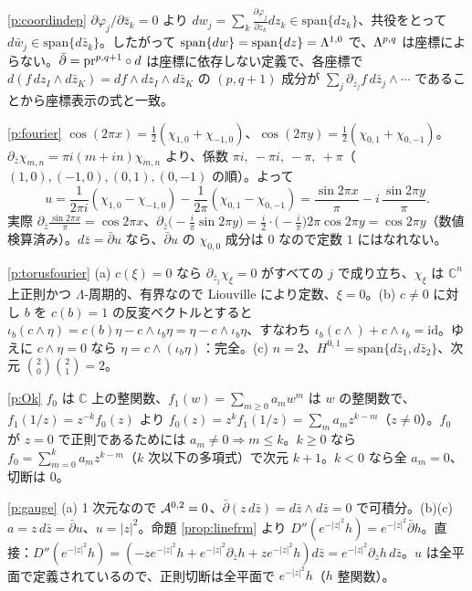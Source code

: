 \begin{sol}{\ref{p:coordindep}}
$\partial\varphi_j/\partial\bar z_k=0$ より $dw_j=\sum_k\frac{\partial\varphi_j}{\partial z_k}dz_k\in\mathrm{span}\{dz_k\}$、共役をとって $d\bar w_j\in\mathrm{span}\{d\bar z_k\}$。したがって $\mathrm{span}\{dw\}=\mathrm{span}\{dz\}=\Lambda^{1,0}$ で、$\Lambda^{p,q}$ は座標によらない。$\bar\partial=\mathrm{pr}^{p,q+1}\circ d$ は座標に依存しない定義で、各座標で $d(f\,dz_I\wedge d\bar z_K)=df\wedge dz_I\wedge d\bar z_K$ の $(p,q+1)$ 成分が $\sum_j\partial_{\bar z_j}f\,d\bar z_j\wedge\cdots$ であることから座標表示の式と一致。
\end{sol}
\begin{sol}{\ref{p:fourier}}
$\cos(2\pi x)=\frac12(\chi_{1,0}+\chi_{-1,0})$、$\cos(2\pi y)=\frac12(\chi_{0,1}+\chi_{0,-1})$。$\partial_{\bar z}\chi_{m,n}=\pi i(m+in)\chi_{m,n}$ より、係数 $\pi i,\ -\pi i,\ -\pi,\ +\pi$（$(1,0),(-1,0),(0,1),(0,-1)$ の順）。よって
\[
u=\frac1{2\pi i}(\chi_{1,0}-\chi_{-1,0})-\frac1{2\pi}(\chi_{0,1}-\chi_{0,-1})=\frac{\sin 2\pi x}{\pi}-i\,\frac{\sin2\pi y}{\pi}.
\]
実際 $\partial_{\bar z}\frac{\sin2\pi x}\pi=\cos2\pi x$、$\partial_{\bar z}\big(-\tfrac i\pi\sin2\pi y\big)=\frac i2\cdot\big(-\tfrac i\pi\big)2\pi\cos2\pi y=\cos2\pi y$（数値検算済み）。$d\bar z=\bar\partial u$ なら、$\bar\partial u$ の $\chi_{0,0}$ 成分は $0$ なので定数 $1$ にはなれない。
\end{sol}
\begin{sol}{\ref{p:torusfourier}}
(a) $c(\xi)=0$ なら $\partial_{\bar z_j}\chi_\xi=0$ がすべての $j$ で成り立ち、$\chi_\xi$ は $\mathbb C^n$ 上正則かつ $\Lambda$-周期的、有界なので Liouville により定数、$\xi=0$。(b) $c\ne0$ に対し $b$ を $c(b)=1$ の反変ベクトルとすると $\iota_b(c\wedge\eta)=c(b)\eta-c\wedge\iota_b\eta=\eta-c\wedge\iota_b\eta$、すなわち $\iota_b(c\wedge)+c\wedge\iota_b=\mathrm{id}$。ゆえに $c\wedge\eta=0$ なら $\eta=c\wedge(\iota_b\eta)$：完全。(c) $n=2$、$H^{0,1}=\mathrm{span}\{d\bar z_1,d\bar z_2\}$、次元 $\binom20\binom21=2$。
\end{sol}
\begin{sol}{\ref{p:Ok}}
$f_0$ は $\mathbb C$ 上の整関数、$f_1(w)=\sum_{m\ge0}a_mw^m$ は $w$ の整関数で、$f_1(1/z)=z^{-k}f_0(z)$ より $f_0(z)=z^kf_1(1/z)=\sum_ma_mz^{k-m}$（$z\ne0$）。$f_0$ が $z=0$ で正則であるためには $a_m\ne0\Rightarrow m\le k$。$k\ge0$ なら $f_0=\sum_{m=0}^ka_mz^{k-m}$（$k$ 次以下の多項式）で次元 $k+1$。$k<0$ なら全 $a_m=0$、切断は $0$。
\end{sol}
\begin{sol}{\ref{p:gauge}}
(a) 1 次元なので $\mathcal A^{0,2}=0$、$\bar\partial(z\,d\bar z)=d\bar z\wedge d\bar z=0$ で可積分。(b)(c) $a=z\,d\bar z=\bar\partial u$、$u=|z|^2$。命題 \ref{prop:linefrm} より $D''(e^{-|z|^2}h)=e^{-|z|^2}\bar\partial h$。直接：$D''(e^{-|z|^2}h)=(-ze^{-|z|^2}h+e^{-|z|^2}\partial_{\bar z}h+ze^{-|z|^2}h)d\bar z=e^{-|z|^2}\partial_{\bar z}h\,d\bar z$。$u$ は全平面で定義されているので、正則切断は全平面で $e^{-|z|^2}h$（$h$ 整関数）。
\end{sol}
